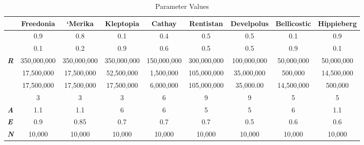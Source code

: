 \documentclass[12pt]{article}
\begin{document}
\begin{spacing}{1.5}

\begin{table}[]
\footnotesize

\begin{tabular}{lcccccccc}
\toprule
                    & \textbf{Freedonia} & \textbf{`Merika} & \textbf{Kleptopia} & \textbf{Cathay} & \textbf{Rentistan} & \textbf{Develpolus} & \textbf{Bellicostic} & \textbf{Hippieberg} \\ \hline
\boldmath{$\alpha$}   & 0.9              & 0.8              & 0.1                & 0.4             & 0.5                & 0.5                 & 0.1                  & 0.9                 \\
\boldmath{$\gamma$}   & 0.1                & 0.2              & 0.9                & 0.6             & 0.5                & 0.5                 & 0.9                  & 0.1                 \\
\textit{\textbf{R}} & 350,000,000        & 350,000,000      & 350,000,000        & 150,000,000     & 300,000,000        & 100,000,000         & 50,000,000           & 50,000,000          \\
\boldmath{$\Phi$}     & 17,500,000         & 17,500,000       & 52,500,000         & 1,500,000       & 105,000,000        & 35,000,000          & 500,000              & 14,500,000          \\
\boldmath{$\Omega$}   & 17,500,000         & 17,500,000       & 17,500,000         & 6,000,000       & 105,000,000        & 35,000.00           & 14,500,000           & 500,000             \\
\boldmath{$\sigma$}   & 3                  & 3                & 3                  & 6               & 9                  & 9                   & 5                    & 5                   \\
\textit{\textbf{A}} & 1.1                & 1.1              & 6                  & 6               & 5                  & 5                   & 6                    & 1.1                 \\
\textit{\textbf{E}} & 0.9                & 0.85             & 0.7                & 0.7             & 0.7                & 0.5                 & 0.6                  & 0.6                 \\
\textit{\textbf{N}} & 10,000             & 10,000           & 10,000             & 10,000          & 10,000             & 10,000              & 10,000               & 10,000 \\ \hline            
\end{tabular}
\caption{Parameter Values}
\end{table}


\end{spacing}
\end{document}
